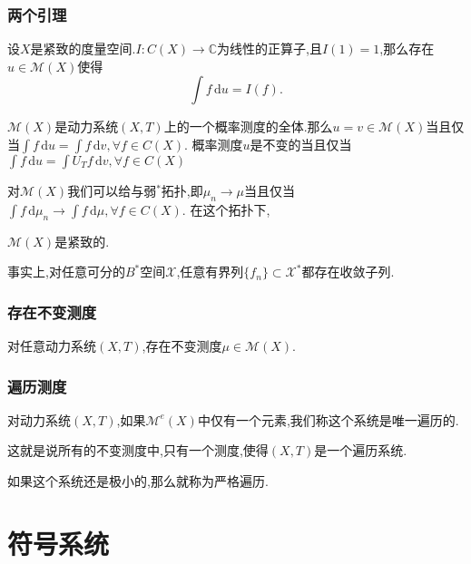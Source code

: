 \documentclass[compress,red]{beamer}
\begin{document}
\begin{frame}
\frametitle{两个引理}
\begin{theorem}

设$X$是紧致的度量空间.$I:C(X)\rightarrow \mathbb{C}$为线性的正算子,且$I(1)=1$,那么存在$u\in \mathcal{M}(X)$使得$$\int \!f\,\mathrm{d}u=I(f).$$

\end{theorem}
\begin{lemma}
\label{l}
$\mathcal{M}(X)$是动力系统$(X,T)$上的一个概率测度的全体.那么$u=v\in \mathcal{M}(X)$当且仅当$\int\!f \, \mathrm{d}u=\int f\, \mathrm{d}v,\forall f\in C(X)$.
概率测度$u$是不变的当且仅当$\int\!f \, \mathrm{d}u=\int\! U_Tf\, \mathrm{d}v,\forall f\in C(X)$
\end{lemma}
\end{frame}

\begin{frame}
对$\mathcal{M}(X)$我们可以给与弱$^*$拓扑,即$\mu_n\rightarrow \mu$当且仅当$\int\!f \, \mathrm{d}\mu_n\rightarrow \int\!f \, \mathrm{d}\mu,\forall f \in C(X)$.
在这个拓扑下,
\begin{theorem}
$\mathcal{M}(X)$是紧致的.
\end{theorem}
\pause
事实上,对任意可分的$B^*$空间$\mathscr X$,任意有界列$\{f_n\}\subset \mathscr{X}^*$都存在收敛子列.
\end{frame}

\begin{frame}
\frametitle{存在不变测度}
\begin{theorem}
对任意动力系统$(X,T)$,存在不变测度$\mu\in\mathcal{M}(X)$.
\end{theorem}
\end{frame}

\begin{frame}
\frametitle{遍历测度}
\begin{definition}
对动力系统$(X,T)$,如果$\mathcal{M}^e(X)$中仅有一个元素,我们称这个系统是唯一遍历的.

\medskip
这就是说所有的不变测度中,只有一个测度,使得$(X,T)$是一个遍历系统.
\pause

\medskip
如果这个系统还是极小的,那么就称为严格遍历.
\end{definition}

\end{frame}


\section{符号系统}
\end{document}
